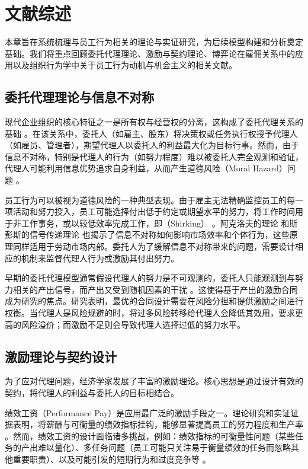 \chapter{文献综述}

本章旨在系统梳理与员工行为相关的理论与实证研究，为后续模型构建和分析奠定基础。我们将重点回顾委托代理理论、激励与契约理论、博弈论在雇佣关系中的应用以及组织行为学中关于员工行为动机与机会主义的相关文献。

\section{委托代理理论与信息不对称}

现代企业组织的核心特征之一是所有权与经营权的分离，这构成了委托代理关系的基础 \citep{jensen1976theory}。在该关系中，委托人（如雇主、股东）将决策权或任务执行权授予代理人（如雇员、管理者），期望代理人以委托人的利益最大化为目标行事。然而，由于信息不对称，特别是代理人的行为（如努力程度）难以被委托人完全观测和验证，代理人可能利用信息优势追求自身利益，从而产生道德风险（Moral Hazard）问题 \citep{holmstrom1979moral}。

员工行为可以被视为道德风险的一种典型表现。由于雇主无法精确监控员工的每一项活动和努力投入，员工可能选择付出低于约定或期望水平的努力，将工作时间用于非工作事务，或以较低效率完成工作，即（Shirking） \citep{alchian1972production}。阿克洛夫的理论 \citep{akerlof1970market} 和斯彭斯的信号传递理论 \citep{spence1973job} 也揭示了信息不对称如何影响市场效率和个体行为，这些原理同样适用于劳动市场内部。委托人为了缓解信息不对称带来的问题，需要设计相应的机制来监督代理人行为或激励其付出努力。

早期的委托代理模型通常假设代理人的努力是不可观测的，委托人只能观测到与努力相关的产出信号，而产出又受到随机因素的干扰 \citep{holmstrom1979moral, grossman1983analysis}。这使得基于产出的激励合同成为研究的焦点。研究表明，最优的合同设计需要在风险分担和提供激励之间进行权衡。当代理人是风险规避的时，将过多风险转移给代理人会降低其效用，要求更高的风险溢价；而激励不足则会导致代理人选择过低的努力水平。

\section{激励理论与契约设计}

为了应对代理问题，经济学家发展了丰富的激励理论。核心思想是通过设计有效的契约，将代理人的利益与委托人的目标相结合。

绩效工资（Performance Pay）是应用最广泛的激励手段之一。理论研究和实证证据表明，将薪酬与可衡量的绩效指标挂钩，能够显著提高员工的努力程度和生产率 \citep{lazear1999performance}。然而，绩效工资的设计面临诸多挑战，例如：绩效指标的可衡量性问题（某些任务的产出难以量化）、多任务问题（员工可能只关注易于衡量绩效的任务而忽略其他重要职责）、以及可能引发的短期行为和过度竞争等 \citep{holmstrom1991multitask}。


